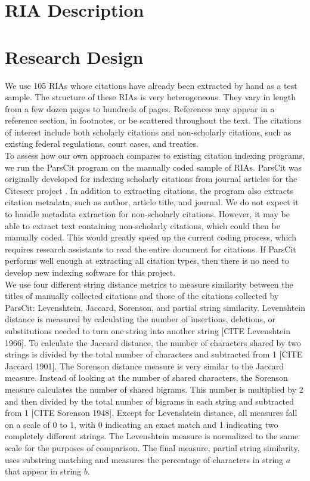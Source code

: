 \documentclass[12pt]{article}
\begin{document}
\section{RIA Description}

\section{Research Design}
We use 105 RIAs whose citations have already been extracted by hand as a test sample. The structure of these RIAs is very heterogeneous. They vary in length from a few dozen pages to hundreds of pages. References may appear in a reference section, in footnotes, or be scattered throughout the text. The citations of interest include both scholarly citations and non-scholarly citations, such as existing federal regulations, court cases, and treaties. \\ 

To assess how our own approach compares to existing citation indexing programs, we run the ParsCit program on the manually coded sample of RIAs. ParsCit was originally developed for indexing scholarly citations from journal articles for the Citeseer project \cite{councilletal2008}. In addition to extracting citations, the program also extracts citation metadata, such as author, article title, and journal. We do not expect it to handle metadata extraction for non-scholarly citations. However, it may be able to extract text containing non-scholarly citations, which could then be manually coded. This would greatly speed up the current coding process, which requires research assistants to read the entire document for citations. If ParsCit performs well enough at extracting all citation types, then there is no need to develop new indexing software for this project.\\

We use four different string distance metrics to measure similarity between the titles of manually collected citations and those of the citations collected by ParsCit: Levenshtein, Jaccard, Sorenson, and partial string similarity. Levenshtein distance is measured by calculating the number of insertions, deletions, or substitutions needed to turn one string into another string [CITE Levenshtein 1966]. To calculate the Jaccard distance, the number of characters shared by two strings is divided by the total number of characters and subtracted from 1 [CITE Jaccard 1901]. The Sorenson distance measure is very similar to the Jaccard measure. Instead of looking at the number of shared characters, the Sorenson measure calculates the number of shared bigrams. This number is multiplied by 2 and then divided by the total number of bigrams in each string and subtracted from 1 [CITE Sorenson 1948]. Except for Levenshtein distance, all measures fall on a scale of 0 to 1, with 0 indicating an exact match and 1 indicating two completely different strings. The Levenshtein measure is normalized to the same scale for the purposes of comparison. The final measure, partial string similarity, uses substring matching and measures the percentage of characters in string $a$ that appear in string $b$.\\
\end{document}
